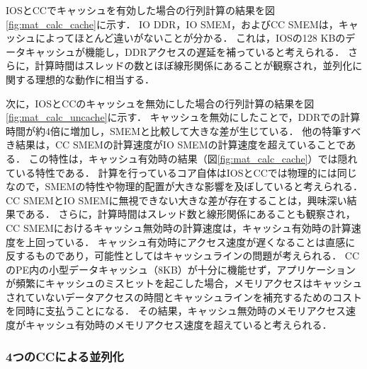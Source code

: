 \documentclass[submit,techrep]{ipsj_v2/UTF8/ipsj}
\begin{document}
IOSとCCでキャッシュを有効した場合の行列計算の結果を図\ref{fig:mat_calc_cache}に示す．
IO DDR，IO SMEM，およびCC SMEMは，キャッシュによってほとんど違いがないことが分かる．
これは，IOSの128 KBのデータキャッシュが機能し，DDRアクセスの遅延を補っていると考えられる．
さらに，計算時間はスレッドの数とほぼ線形関係にあることが観察され，並列化に関する理想的な動作に相当する．

次に，IOSとCCのキャッシュを無効にした場合の行列計算の結果を図\ref{fig:mat_calc_uncache}に示す．
キャッシュを無効にしたことで，DDRでの計算時間が約4倍に増加し，SMEMと比較して大きな差が生じている．
他の特筆すべき結果は，CC SMEMの計算速度がIO SMEMの計算速度を超えていることである．
この特性は，キャッシュ有効時の結果（図\ref{fig:mat_calc_cache}）では隠れている特性である．
計算を行っているコア自体はIOSとCCでは物理的には同じなので，SMEMの特性や物理的配置が大きな影響を及ぼしていると考えられる．
CC SMEMとIO SMEMに無視できない大きな差が存在することは，興味深い結果である．
さらに，計算時間はスレッド数と線形関係にあることも観察され，CC SMEMにおけるキャッシュ無効時の計算速度は，キャッシュ有効時の計算速度を上回っている．
キャッシュ有効時にアクセス速度が遅くなることは直感に反するものであり，可能性としてはキャッシュラインの問題が考えられる．
CCのPE内の小型データキャッシュ（8KB）が十分に機能せず，アプリケーションが頻繁にキャッシュのミスヒットを起こした場合，メモリアクセスはキャッシュされていないデータアクセスの時間とキャッシュラインを補充するためのコストを同時に支払うことになる．
その結果，キャッシュ無効時のメモリアクセス速度がキャッシュ有効時のメモリアクセス速度を超えていると考えられる．

\subsubsection{4つのCCによる並列化}
\label{sec:four_CCs}
\end{document}

